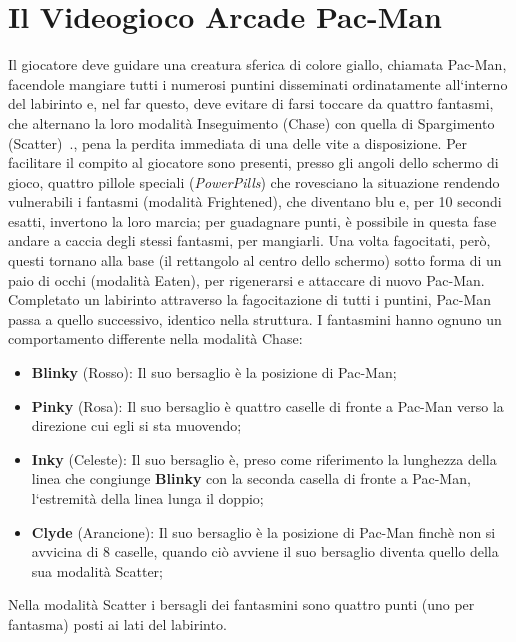 \documentclass[12pt,a4paper]{report}
\begin{document}
\section{Il Videogioco Arcade Pac-Man}\label{se:gal}
Il giocatore deve guidare una creatura sferica di colore giallo, chiamata Pac-Man, facendole mangiare tutti i numerosi puntini disseminati ordinatamente all`interno del labirinto e, nel far questo, deve evitare di farsi toccare da quattro fantasmi, che alternano la loro modalità Inseguimento (Chase) con quella di Spargimento (Scatter)~\cite{pacmanai}., pena la perdita immediata di una delle vite a disposizione. Per facilitare il compito al giocatore sono presenti, presso gli angoli dello schermo di gioco, quattro pillole speciali (\emph{PowerPills}) che rovesciano la situazione rendendo vulnerabili i fantasmi (modalità Frightened), che diventano blu e, per 10 secondi esatti, invertono la loro marcia; per guadagnare punti, è possibile in questa fase andare a caccia degli stessi fantasmi, per mangiarli.
Una volta fagocitati, però, questi tornano alla base (il rettangolo al centro dello schermo) sotto forma di un paio di occhi (modalità Eaten), per rigenerarsi e attaccare di nuovo Pac-Man. Completato un labirinto attraverso la fagocitazione di tutti i puntini, Pac-Man passa a quello successivo, identico nella struttura. I fantasmini hanno ognuno un comportamento differente nella modalità Chase:
\begin{itemize}
\item \textbf{Blinky} (Rosso): Il suo bersaglio è la posizione di Pac-Man;
\item \textbf{Pinky} (Rosa): Il suo bersaglio è quattro caselle di fronte a Pac-Man verso la direzione cui egli si sta muovendo;
\item \textbf{Inky} (Celeste): Il suo bersaglio è, preso come riferimento la lunghezza della linea che congiunge \textbf{Blinky} con la seconda casella di fronte a Pac-Man, l`estremità della linea lunga il doppio;
\item \textbf{Clyde} (Arancione): Il suo bersaglio è la posizione di Pac-Man finchè non si avvicina di 8 caselle, quando ciò avviene il suo bersaglio diventa quello della sua modalità Scatter;
\end{itemize}
Nella modalità Scatter i bersagli dei fantasmini sono quattro punti (uno per fantasma) posti ai lati del labirinto.
\end{document}
